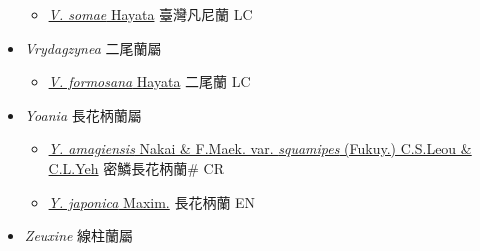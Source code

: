 \begin{itemize}
  \begin{itemize}
        \item[] \href{http://www.theplantlist.org/tpl1.1/search?q=Vanilla+somae}{\textit{V. somae} Hayata}     臺灣凡尼蘭 LC
  \end{itemize}
 \item[] \textit{Vrydagzynea} 二尾蘭屬
                    
  \begin{itemize}
        \item[] \href{http://www.theplantlist.org/tpl1.1/search?q=Vrydagzynea+formosana}{\textit{V. formosana} Hayata}     二尾蘭 LC
  \end{itemize}
 \item[] \textit{Yoania} 長花柄蘭屬
                    
  \begin{itemize}
        \item[] \href{http://www.theplantlist.org/tpl1.1/search?q=Yoania+amagiensis+var.+squamipes}{\textit{Y. amagiensis} Nakai \& F.Maek. var. \textit{squamipes} (Fukuy.) C.S.Leou \& C.L.Yeh}   密鱗長花柄蘭\# CR
        \item[] \href{http://www.theplantlist.org/tpl1.1/search?q=Yoania+japonica}{\textit{Y. japonica} Maxim.}   長花柄蘭 EN
  \end{itemize}
 \item[] \textit{Zeuxine} 線柱蘭屬
                    

\end{itemize}
